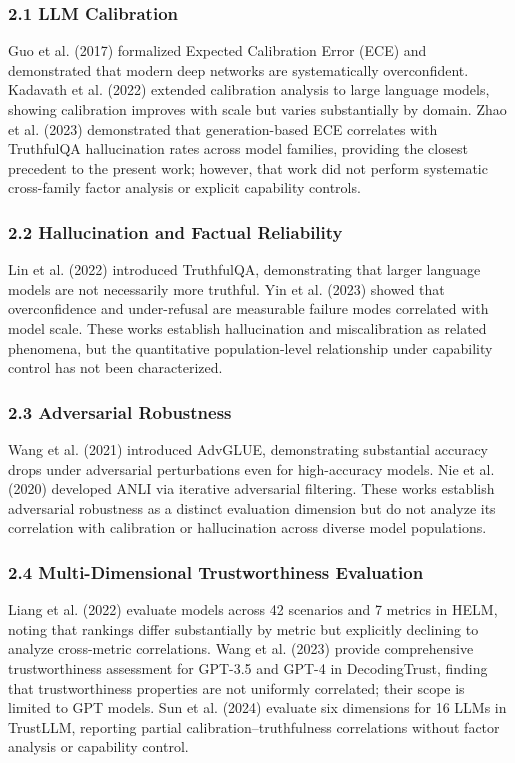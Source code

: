 
\subsubsection{2.1 LLM Calibration}

Guo et al. (2017) formalized Expected Calibration Error (ECE) and demonstrated that modern deep networks are systematically overconfident. Kadavath et al. (2022) extended calibration analysis to large language models, showing calibration improves with scale but varies substantially by domain. Zhao et al. (2023) demonstrated that generation-based ECE correlates with TruthfulQA hallucination rates across model families, providing the closest precedent to the present work; however, that work did not perform systematic cross-family factor analysis or explicit capability controls.

\subsubsection{2.2 Hallucination and Factual Reliability}

Lin et al. (2022) introduced TruthfulQA, demonstrating that larger language models are not necessarily more truthful. Yin et al. (2023) showed that overconfidence and under-refusal are measurable failure modes correlated with model scale. These works establish hallucination and miscalibration as related phenomena, but the quantitative population-level relationship under capability control has not been characterized.

\subsubsection{2.3 Adversarial Robustness}

Wang et al. (2021) introduced AdvGLUE, demonstrating substantial accuracy drops under adversarial perturbations even for high-accuracy models. Nie et al. (2020) developed ANLI via iterative adversarial filtering. These works establish adversarial robustness as a distinct evaluation dimension but do not analyze its correlation with calibration or hallucination across diverse model populations.

\subsubsection{2.4 Multi-Dimensional Trustworthiness Evaluation}

Liang et al. (2022) evaluate models across 42 scenarios and 7 metrics in HELM, noting that rankings differ substantially by metric but explicitly declining to analyze cross-metric correlations. Wang et al. (2023) provide comprehensive trustworthiness assessment for GPT-3.5 and GPT-4 in DecodingTrust, finding that trustworthiness properties are not uniformly correlated; their scope is limited to GPT models. Sun et al. (2024) evaluate six dimensions for 16 LLMs in TrustLLM, reporting partial calibration–truthfulness correlations without factor analysis or capability control.

